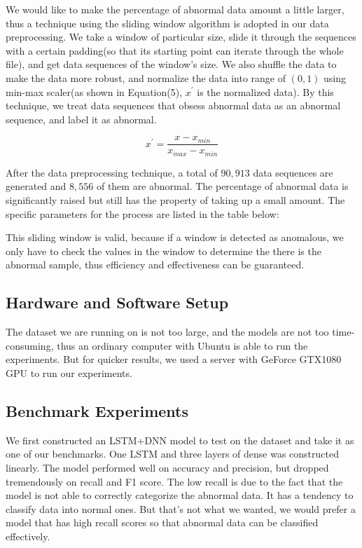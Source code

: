 \documentclass{acmtog} %
\begin{document}
We would like to make the percentage of abnormal data amount a little larger, thus a technique using the sliding window algorithm is adopted in our data preprocessing. We take a window of particular size, slide it through the sequences with a certain padding(so that its starting point can iterate through the whole file), and get data sequences of the window's size. We also shuffle the data to make the data more robust, and normalize the data into range of $(0, 1)$ using min-max scaler(as shown in Equation(5), $x^{'}$ is the normalized data). By this technique, we treat data sequences that obsess abnormal data as an abnormal sequence, and label it as abnormal.

\begin{equation}
x^{'} = \frac{x - x_{min}}{x_{max} - x_{min}}
\label{eq:samplevar}
\end{equation}

After the data preprocessing technique, a total of $90,913$ data sequences are generated and $8,556$ of them are abnormal. The percentage of abnormal data is significantly raised but still has the property of taking up a small amount. The specific parameters for the process are listed in the table below:

\begin{table}[h]
\end{table}

This sliding window is valid, because if a window is detected as anomalous, we only have to check the values in the window to determine the there is the abnormal sample, thus efficiency and effectiveness can be guaranteed. 

\subsection{Hardware and Software Setup}
The dataset we are running on is not too large, and the models are not too time-consuming, thus an ordinary computer with Ubuntu is able to run the experiments. But for quicker results, we used a server with GeForce GTX1080 GPU to run our experiments. 


\subsection{Benchmark Experiments}
We first constructed an LSTM+DNN model to test on the dataset and take it as one of our benchmarks. One LSTM and three layers of dense was constructed linearly. The model performed well on accuracy and precision, but dropped tremendously on recall and F1 score. The low recall is due to the fact that the model is not able to correctly categorize the abnormal data. It has a tendency to classify data into normal ones. But that's not what we wanted, we would prefer a model that has high recall scores so that abnormal data can be classified effectively.
\end{document}
